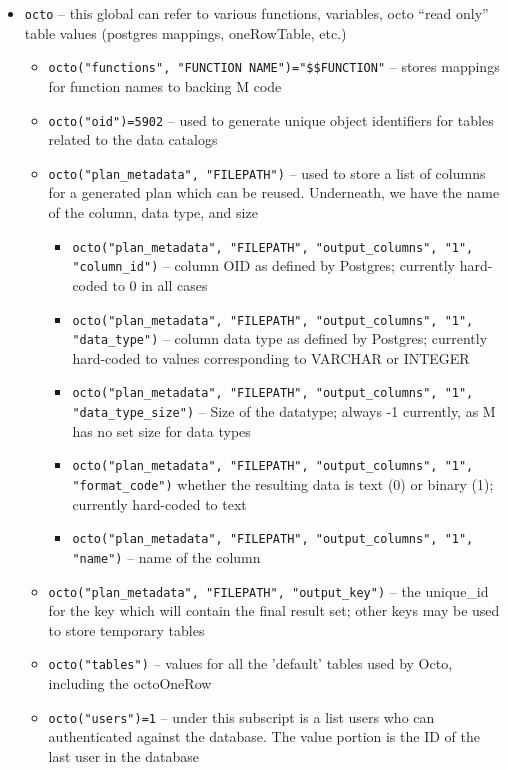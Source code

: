 \documentclass[]{article}
\def\code#1{\texttt{#1}}
\begin{document}
\begin{itemize}
	\item \code{octo} -- this global can refer to various functions, variables, octo “read only” table values (postgres mappings, oneRowTable, etc.)
	\begin{itemize}
		\item \code{octo("functions", "FUNCTION NAME")="\$\$FUNCTION"} -- stores mappings for function names to backing M code
		\item \code{octo("oid")=5902} -- used to generate unique object identifiers for tables related to the data catalogs
		\item \code{octo("plan\_metadata", "FILEPATH")} -- used to store a list of columns for a generated plan which can be reused. Underneath, we have the name of the column, data type, and size
		\begin{itemize}
			\item \code{octo("plan\_metadata", "FILEPATH", "output\_columns", "1", "column\_id")} -- column OID as defined by Postgres; currently hard-coded to 0 in all cases
			\item \code{octo("plan\_metadata", "FILEPATH", "output\_columns", "1", "data\_type")} -- column data type as defined by Postgres; currently hard-coded to values corresponding to VARCHAR or INTEGER
			\item \code{octo("plan\_metadata", "FILEPATH", "output\_columns", "1", "data\_type\_size")} -- Size of the datatype; always -1 currently, as M has no set size for data types
			\item \code{octo("plan\_metadata", "FILEPATH", "output\_columns", "1", "format\_code")} whether the resulting data is text (0) or binary (1); currently hard-coded to text
			\item \code{octo("plan\_metadata", "FILEPATH", "output\_columns", "1", "name")} -- name of the column
		\end{itemize}
		\item \code{octo("plan\_metadata", "FILEPATH", "output\_key")} -- the unique\_id for the key which will contain the final result set; other keys may be used to store temporary tables
		\item \code{octo("tables")} -- values for all the 'default' tables used by Octo, including the octoOneRow
		\item \code{octo("users")=1} -- under this subscript is a list users who can authenticated against the database. The value portion is the ID of the last user in the database
		\begin{itemize}

\end{itemize}
\end{itemize}
\end{itemize}
\end{document}
